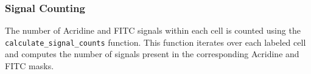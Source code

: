 \documentclass[a4paper,12pt]{article}
\begin{document}
\subsubsection{Signal Counting}

The number of Acridine and FITC signals within each cell is counted using the \texttt{calculate\_signal\_counts} function. This function iterates over each labeled cell and computes the number of signals present in the corresponding Acridine and FITC masks.


\end{document}
